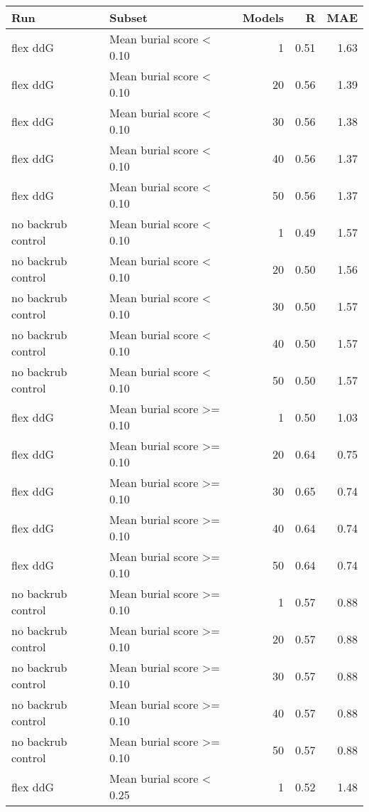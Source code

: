 \begin{table}
\begin{tabular}{llrrr}
\toprule
                Run &                     Subset &  Models &    R &  MAE \\
\midrule
           flex ddG &   Mean burial score < 0.10 &       1 & 0.51 & 1.63 \\
           flex ddG &   Mean burial score < 0.10 &      20 & 0.56 & 1.39 \\
           flex ddG &   Mean burial score < 0.10 &      30 & 0.56 & 1.38 \\
           flex ddG &   Mean burial score < 0.10 &      40 & 0.56 & 1.37 \\
           flex ddG &   Mean burial score < 0.10 &      50 & 0.56 & 1.37 \\
 no backrub control &   Mean burial score < 0.10 &       1 & 0.49 & 1.57 \\
 no backrub control &   Mean burial score < 0.10 &      20 & 0.50 & 1.56 \\
 no backrub control &   Mean burial score < 0.10 &      30 & 0.50 & 1.57 \\
 no backrub control &   Mean burial score < 0.10 &      40 & 0.50 & 1.57 \\
 no backrub control &   Mean burial score < 0.10 &      50 & 0.50 & 1.57 \\
           flex ddG &  Mean burial score >= 0.10 &       1 & 0.50 & 1.03 \\
           flex ddG &  Mean burial score >= 0.10 &      20 & 0.64 & 0.75 \\
           flex ddG &  Mean burial score >= 0.10 &      30 & 0.65 & 0.74 \\
           flex ddG &  Mean burial score >= 0.10 &      40 & 0.64 & 0.74 \\
           flex ddG &  Mean burial score >= 0.10 &      50 & 0.64 & 0.74 \\
 no backrub control &  Mean burial score >= 0.10 &       1 & 0.57 & 0.88 \\
 no backrub control &  Mean burial score >= 0.10 &      20 & 0.57 & 0.88 \\
 no backrub control &  Mean burial score >= 0.10 &      30 & 0.57 & 0.88 \\
 no backrub control &  Mean burial score >= 0.10 &      40 & 0.57 & 0.88 \\
 no backrub control &  Mean burial score >= 0.10 &      50 & 0.57 & 0.88 \\
           flex ddG &   Mean burial score < 0.25 &       1 & 0.52 & 1.48 \\

\end{tabular}
\end{table}
